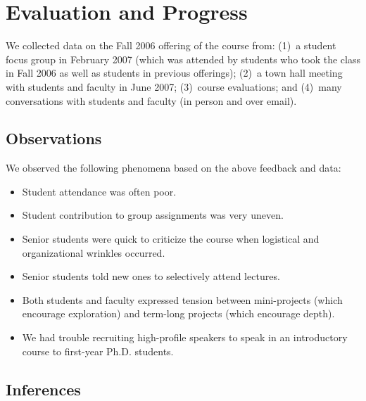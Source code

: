 \begin{small}


\end{small}


\section{Evaluation and Progress}\label{sec:progress}

We collected data on the Fall 2006 offering of the course
from: (1)~a student focus group in February 2007 (which was attended by
students who took the class in Fall 2006 as well as students in previous
offerings); (2)~a town hall meeting with students and faculty in June
2007; (3)~course evaluations; and (4)~many conversations with students
and faculty (in person and over email).

\subsection{Observations}

We observed the following phenomena based on the above feedback and
data:
\begin{itemize}
\itemsep=-1pt
\item Student attendance was often poor.
\item Student contribution to group assignments was very uneven.
\item Senior students were quick to criticize the course when logistical
  and organizational wrinkles occurred.
\item Senior students told new ones to selectively attend lectures.
\item Both students and faculty expressed tension between mini-projects
  (which encourage exploration) and term-long projects (which encourage
  depth). 
\item We had trouble recruiting high-profile speakers to speak in an
  introductory course to first-year Ph.D. students.
\end{itemize}

\subsection{Inferences}


